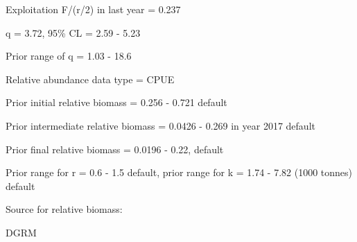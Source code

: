 \documentclass[12pt,a4paper]{article}\usepackage[]{graphicx}\usepackage[]{xcolor}
\begin{document}
Exploitation F/(r/2) in last year = 0.237

q = 3.72, 95\% CL = 2.59 - 5.23

Prior range of q = 1.03 - 18.6

Relative abundance data type = CPUE

Prior initial relative biomass = 0.256 - 0.721 default

Prior intermediate relative biomass = 0.0426 - 0.269 in year 2017 default

Prior final relative biomass = 0.0196 - 0.22, default

Prior range for r = 0.6 - 1.5 default, prior range for k = 1.74 - 7.82 (1000 tonnes) default

Source for relative biomass: 

DGRM

    
\end{document}
